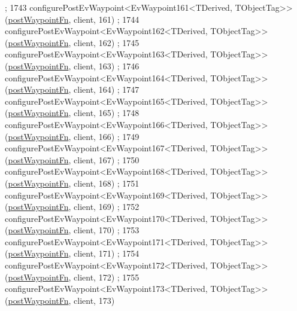 \begin{DoxyCode}
      ;
1743     configurePostEvWaypoint<EvWaypoint161<TDerived, TObjectTag>>(\hyperlink{classcl__move__base__z_1_1WaypointEventDispatcher_a964a57fcce5d48ec60243230722d8dd7}{postWaypointFn}, client, 161)
      ;
1744     configurePostEvWaypoint<EvWaypoint162<TDerived, TObjectTag>>(\hyperlink{classcl__move__base__z_1_1WaypointEventDispatcher_a964a57fcce5d48ec60243230722d8dd7}{postWaypointFn}, client, 162)
      ;
1745     configurePostEvWaypoint<EvWaypoint163<TDerived, TObjectTag>>(\hyperlink{classcl__move__base__z_1_1WaypointEventDispatcher_a964a57fcce5d48ec60243230722d8dd7}{postWaypointFn}, client, 163)
      ;
1746     configurePostEvWaypoint<EvWaypoint164<TDerived, TObjectTag>>(\hyperlink{classcl__move__base__z_1_1WaypointEventDispatcher_a964a57fcce5d48ec60243230722d8dd7}{postWaypointFn}, client, 164)
      ;
1747     configurePostEvWaypoint<EvWaypoint165<TDerived, TObjectTag>>(\hyperlink{classcl__move__base__z_1_1WaypointEventDispatcher_a964a57fcce5d48ec60243230722d8dd7}{postWaypointFn}, client, 165)
      ;
1748     configurePostEvWaypoint<EvWaypoint166<TDerived, TObjectTag>>(\hyperlink{classcl__move__base__z_1_1WaypointEventDispatcher_a964a57fcce5d48ec60243230722d8dd7}{postWaypointFn}, client, 166)
      ;
1749     configurePostEvWaypoint<EvWaypoint167<TDerived, TObjectTag>>(\hyperlink{classcl__move__base__z_1_1WaypointEventDispatcher_a964a57fcce5d48ec60243230722d8dd7}{postWaypointFn}, client, 167)
      ;
1750     configurePostEvWaypoint<EvWaypoint168<TDerived, TObjectTag>>(\hyperlink{classcl__move__base__z_1_1WaypointEventDispatcher_a964a57fcce5d48ec60243230722d8dd7}{postWaypointFn}, client, 168)
      ;
1751     configurePostEvWaypoint<EvWaypoint169<TDerived, TObjectTag>>(\hyperlink{classcl__move__base__z_1_1WaypointEventDispatcher_a964a57fcce5d48ec60243230722d8dd7}{postWaypointFn}, client, 169)
      ;
1752     configurePostEvWaypoint<EvWaypoint170<TDerived, TObjectTag>>(\hyperlink{classcl__move__base__z_1_1WaypointEventDispatcher_a964a57fcce5d48ec60243230722d8dd7}{postWaypointFn}, client, 170)
      ;
1753     configurePostEvWaypoint<EvWaypoint171<TDerived, TObjectTag>>(\hyperlink{classcl__move__base__z_1_1WaypointEventDispatcher_a964a57fcce5d48ec60243230722d8dd7}{postWaypointFn}, client, 171)
      ;
1754     configurePostEvWaypoint<EvWaypoint172<TDerived, TObjectTag>>(\hyperlink{classcl__move__base__z_1_1WaypointEventDispatcher_a964a57fcce5d48ec60243230722d8dd7}{postWaypointFn}, client, 172)
      ;
1755     configurePostEvWaypoint<EvWaypoint173<TDerived, TObjectTag>>(\hyperlink{classcl__move__base__z_1_1WaypointEventDispatcher_a964a57fcce5d48ec60243230722d8dd7}{postWaypointFn}, client, 173)

\end{DoxyCode}
